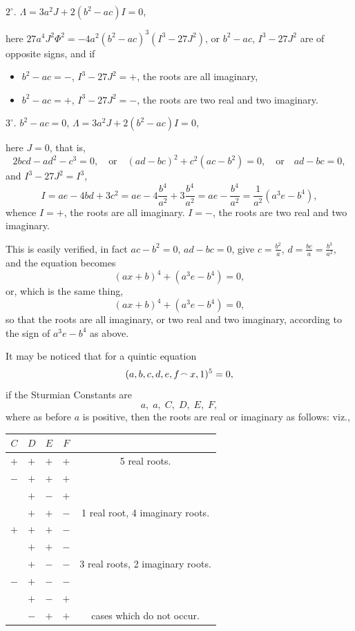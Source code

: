 \documentclass[11pt,a4paper]{article}
\theoremstyle{plain}
\begin{document}
$2^\circ$. $\Lambda = 3a^2J + 2(b^2 - ac)I = 0$,

here $27a^4J^2\Phi^2 = -4a^2(b^2 - ac)^3(I^3 - 27J^2)$, or $b^2 - ac$, $I^3 - 27J^2$ are of opposite signs, and if
\begin{itemize}
    \item $b^2 - ac = -$, $I^3 - 27J^2 = +$, the roots are all imaginary,
    \item $b^2 - ac = +$, $I^3 - 27J^2 = -$, the roots are two real and two imaginary.
\end{itemize}

$3^\circ$. $b^2 - ac = 0$, $\Lambda = 3a^2J + 2(b^2 - ac)I = 0$,

here $J = 0$, that is,
\[
2bcd - ad^2 - c^3 = 0,\quad \text{or}\quad (ad - bc)^2 + c^2(ac - b^2) = 0,\quad \text{or}\quad ad - bc = 0,
\]
and $I^3 - 27J^2 = I^3$,
\[
I = ae - 4bd + 3c^2 = ae - 4\frac{b^4}{a^2} + 3\frac{b^4}{a^2} = ae - \frac{b^4}{a^2} = \frac{1}{a^2}(a^3e - b^4),
\]
whence $I = +$, the roots are all imaginary. $I = -$, the roots are two real and two imaginary.

This is easily verified, in fact $ac - b^2 = 0$, $ad - bc = 0$, give $c = \frac{b^2}{a}$, $d = \frac{bc}{a} = \frac{b^3}{a^2}$, and the equation becomes
\[
(ax + b)^4 + (a^3e - b^4) = 0,
\]
or, which is the same thing,
\[
(ax + b)^4 + (a^3e - b^4) = 0,
\]
so that the roots are all imaginary, or two real and two imaginary, according to the sign of $a^3e - b^4$ as above.

It may be noticed that for a quintic equation
\[
(a, b, c, d, e, f \mathbin{\vcenter{\hbox{$\scriptstyle\!\frown$}}} x, 1)^5 = 0,
\]
if the Sturmian Constants are
\[
a,\; a,\; C,\; D,\; E,\; F,
\]
where as before $a$ is positive, then the roots are real or imaginary as follows: viz.,
\begin{center}
\begin{tabular}{cccc|c}
$C$ & $D$ & $E$ & $F$ & \\\hline
$+$ & $+$ & $+$ & $+$ & 5 real roots.\\
$-$ & $+$ & $+$ & $+$ & \\[-4pt]
  & $+$ & $-$ & $+$ & \\[-4pt]
  & $+$ & $+$ & $-$ & 1 real root, 4 imaginary roots.\\
$+$ & $+$ & $+$ & $-$ & \\[-4pt]
  & $+$ & $+$ & $-$ & \\[-4pt]
  & $+$ & $-$ & $-$ & 3 real roots, 2 imaginary roots.\\
$-$ & $+$ & $-$ & $-$ & \\[-4pt]
  & $+$ & $-$ & $+$ & \\[-4pt]
  & $-$ & $+$ & $+$ & cases which do not occur.
\end{tabular}
\end{center}
\end{document}
